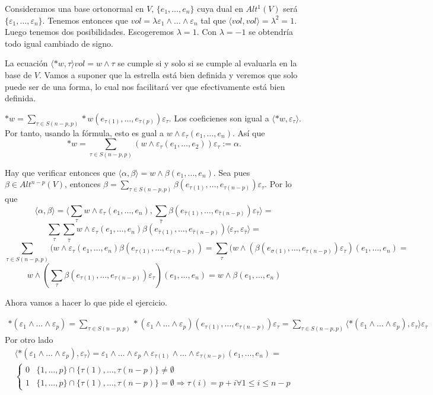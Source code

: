 \documentclass[twoside]{article}
\begin{document}
\begin{solucion}
Consideramos una base ortonormal en $V$, $\{e_1,\dots, e_n\}$ cuya dual en $Alt^1(V)$ será $\{\varepsilon_1,\dots, \varepsilon_n\}$. Tenemos entonces que $vol=\lambda\varepsilon_1\land\dots\land\varepsilon_n$ tal que $\langle vol,vol\rangle=\lambda^2=1$. Luego tenemos dos posibilidades. Escogeremos $\lambda=1$. Con $\lambda=-1$ se obtendría todo igual cambiado de signo.

La ecuación $\langle *w,\tau\rangle vol=w\land \tau$ se cumple si y solo si se cumple al evaluarla en la base de $V$. Vamos a suponer que la estrella está bien definida y veremos que solo puede ser de una forma, lo cual nos facilitará ver que efectivamente está bien definida.

$*w=\sum_{\tau\in S(n-p,p)}*w(e_{\tau(1)},\dots, e_{\tau(p)})\varepsilon_{\tau}$. Los coeficienes son igual a $\langle *w,\varepsilon_{\tau}\rangle$. Por tanto, usando la fórmula, esto es gual a $w\land\varepsilon_{\tau}(e_1,\dots, e_n)$. Así que
\[
*w=\sum_{\tau\in S(n-p,p)}(w\land\varepsilon_{\tau}(e_1,\dots, e_2))\varepsilon_{\tau}:=\alpha.
\]

Hay que verificar entonces que $\langle\alpha,\beta\rangle=w\land\beta(e_1,\dots, e_n)$. Sea pues $\beta\in Alt^{n-p}(V)$, entonces $\beta=\sum_{\tau\in S(n-p,p)}\beta(e_{\tau(1)},\dots, e_{\tau(n-p)})\varepsilon_{\tau}$. Por lo que
\[
\langle \alpha,\beta\rangle=\langle \sum_{\tau} w\land \varepsilon_{\tau}(e_1,\dots, e_n), \sum_{\hat{\tau}}\beta(e_{\hat{\tau}(1)},\dots, e_{\hat{\tau}(n-p)})\varepsilon_{\hat{\tau}}\rangle=
\]
\[
\sum_{\tau}\sum_{\hat{\tau}}w\land\varepsilon_{\tau}(e_1,\dots, e_n)\beta(e_{\hat{\tau}(1)},\dots, e_{\hat{\tau}(n-p)})\langle\varepsilon_{\tau},\varepsilon_{\hat{\tau}}\rangle=
\]
\[
\sum_{\tau\in S(n-p,p)}(w\land\varepsilon_{\tau}(e_1,\dots, e_n)\beta(e_{\tau(1)},\dots, e_{\tau(n-p)})=\sum_{\tau}(w\land(\beta(e_{\sigma(1)},\dots, e_{\tau(n-p)})\varepsilon_{\tau})(e_1,\dots, e_n)=
\]
\[
w\land(\sum_{\tau}\beta(e_{\tau(1)},\dots, e_{\tau(n-p)})\varepsilon_{\tau})(e_1,\dots, e_n)=w\land\beta(e_1,\dots, e_n)
\]

Ahora vamos a hacer lo que pide el ejercicio.

\begin{gather*}
*(\varepsilon_1\land\dots\land\varepsilon_p)=\sum_{\tau\in S(n-p,p)}*(\varepsilon_1\land\dots\land\varepsilon_p)(e_{\tau(1)},\dots, e_{\tau(n-p)})\varepsilon_{\tau}=\sum_{\tau\in S(n-p,p)}\langle *(\varepsilon_1\land\dots\land\varepsilon_p),\varepsilon_{\tau}\rangle\varepsilon_{\tau}
\end{gather*}
Por otro lado
\begin{gather*}
\langle *(\varepsilon_1\land\dots\land\varepsilon_p),\varepsilon_{\tau}\rangle=\varepsilon_1\land\dots\land\varepsilon_p\land\varepsilon_{\tau(1)}\land\dots\land\varepsilon_{\tau(n-p)}(e_1,\dots, e_n)=\\
\begin{cases}
0 & \{1,\dots, p\}\cap\{\tau(1),\dots,\tau(n-p)\}\neq\emptyset\\
1 & \{1,\dots, p\}\cap\{\tau(1),\dots,\tau(n-p)\}=\emptyset\Rightarrow \tau(i)=p+i\forall 1\leq i\leq n-p
\end{cases}
\end{gather*}


\end{solucion}
\end{document}
